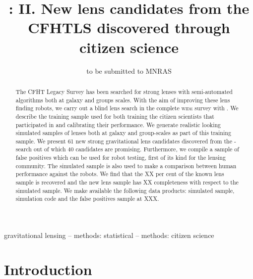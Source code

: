 \documentclass[useAMS,usenatbib,a4paper]{mn2e}
\title[\sw II]
{\SW: II. New lens candidates from the CFHTLS discovered
through citizen science}
\author[More et al.]{%
 
}
\begin{document}
             
\date{to be submitted to MNRAS}
\pagerange{\pageref{firstpage}--\pageref{lastpage}}

\maketitle           

\label{firstpage}


\begin{abstract} 

The CFHT Legacy Survey has been searched for strong lenses with
semi-automated algorithms both at galaxy and groups scales. With the aim
of improving these lens finding robots, we carry out a blind lens search
in the complete \cfhtls \textsc{wide} survey with \sw. We describe the training
sample used for both training the citizen scientists that participated
in \sw and calibrating their performance. We generate realistic looking
simulated samples of lenses both at galaxy and group-scales as part of
this training sample. We present 61 new strong gravitational lens
candidates discovered from the \sw-\cfhtls search out of which 40
candidates are promising. Furthermore, we compile a sample of false
positives which can be used for robot testing, first of its kind for the
lensing community. The simulated sample is also used to make a
comparison between human performance against the robots. We find that
the XX per cent of the known lens sample is recovered and the new lens
sample has XX completeness with respect to the simulated sample. We make
available the following data products: simulated sample, simulation code
and the false positives sample at XXX.

\end{abstract}


\begin{keywords}
  gravitational lensing   --
  methods: statistical    --
  methods: citizen science
\end{keywords}

\setcounter{footnote}{1}


\section{Introduction}
\label{sec:intro}
\end{document}
